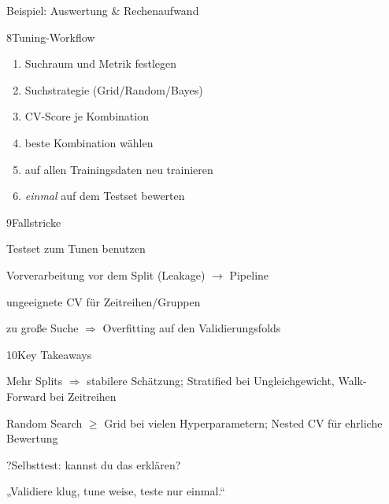 \begin{hngrid}
\begin{hnex}[raster multicolumn=3]{Beispiel: Auswertung \& Rechenaufwand}
\end{hnex}
%
\begin{hnp}[raster multicolumn=3,acc=hnteal]{8}{Tuning-Workflow}
\begin{enumerate}
\item Suchraum und Metrik festlegen
\item Suchstrategie (Grid/Random/Bayes)
\item CV-Score je Kombination
\item beste Kombination wählen
\item auf allen Trainingsdaten neu trainieren
\item \emph{einmal} auf dem Testset bewerten
\end{enumerate}
\end{hnp}
%
\begin{hnp}[raster multicolumn=6,acc=hnred]{9}{Fallstricke}
\begin{hncon}
\item Testset zum Tunen benutzen
\item Vorverarbeitung vor dem Split (Leakage) $\to$ Pipeline
\item ungeeignete CV für Zeitreihen/Gruppen
\item zu große Suche $\Rightarrow$ Overfitting auf den Validierungsfolds
\end{hncon}
\end{hnp}
%
\begin{hnp}[raster multicolumn=6,acc=hnorange]{10}{Key Takeaways}
\begin{hnchk}
\item Mehr Splits $\Rightarrow$ stabilere Schätzung; Stratified bei Ungleichgewicht, Walk-Forward bei Zeitreihen
\item Random Search $\ge$ Grid bei vielen Hyperparametern; Nested CV für ehrliche Bewertung
\end{hnchk}
\end{hnp}
%
\begin{hnp}[raster multicolumn=6,acc=hnpurple,colback=hnlilac!30]{?}{Selbsttest: kannst du das erklären?}
\end{hnp}
%
\begin{hnbanner}[raster multicolumn=6]
„Validiere klug, tune weise, teste nur einmal.“
\end{hnbanner}
\end{hngrid}
